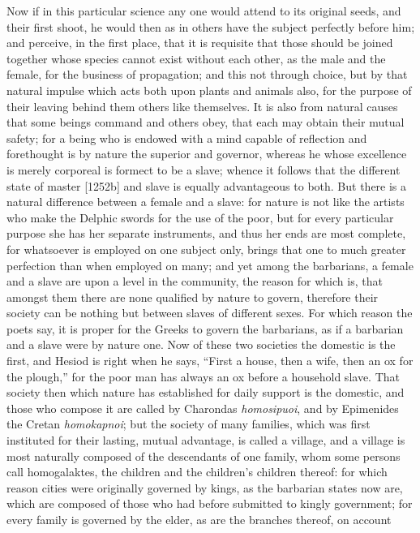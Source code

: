 Now if in this particular science any one would attend to its original
seeds, and their first shoot, he would then as in others have the subject
perfectly before him; and perceive, in the first place, that it is
requisite that those should be joined together whose species cannot exist
without each other, as the male and the female, for the business of
propagation; and this not through choice, but by that natural impulse
which acts both upon plants and animals also, for the purpose of their
leaving behind them others like themselves. It is also from natural causes
that some beings command and others obey, that each may obtain their
mutual safety; for a being who is endowed with a mind capable of
reflection and forethought is by nature the superior and governor, whereas
he whose excellence is merely corporeal is formect to be a slave; whence
it follows that the different state of master [1252b] and slave is equally
advantageous to both. But there is a natural difference between a female
and a slave: for nature is not like the artists who make the Delphic
swords for the use of the poor, but for every particular purpose she has
her separate instruments, and thus her ends are most complete, for
whatsoever is employed on one subject only, brings that one to much
greater perfection than when employed on many; and yet among the
barbarians, a female and a slave are upon a level in the community, the
reason for which is, that amongst them there are none qualified by nature
to govern, therefore their society can be nothing but between slaves of
different sexes. For which reason the poets say, it is proper for the
Greeks to govern the barbarians, as if a barbarian and a slave were by
nature one. Now of these two societies the domestic is the first, and
Hesiod is right when he says, ``First a house, then a wife, then an ox for
the plough,'' for the poor man has always an ox before a household slave.
That society then which nature has established for daily support is the
domestic, and those who compose it are called by Charondas \emph{homosipuoi},
and by Epimenides the Cretan \emph{homokapnoi}; but the society of many
families, which was first instituted for their lasting, mutual advantage,
is called a village, and a village is most naturally composed of the
descendants of one family, whom some persons call homogalaktes, the
children and the children's children thereof: for which reason cities were
originally governed by kings, as the barbarian states now are, which are
composed of those who had before submitted to kingly government; for every
family is governed by the elder, as are the branches thereof, on account
